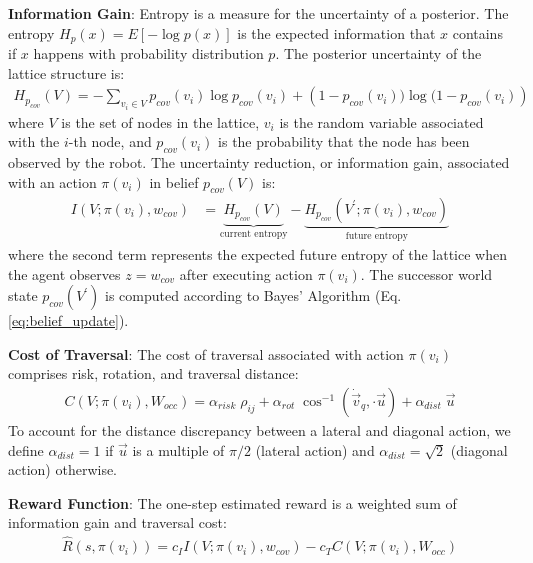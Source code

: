 \documentclass{article}
\newcommand{\ph}[1]{{\textbf{#1}:}} %
\begin{document}
\ph{Information Gain} Entropy is a measure for the uncertainty of a posterior. The entropy $H_p(x) = E[-\log p(x)]$ is the expected information that $x$ contains if $x$ happens with probability distribution $p$. The posterior uncertainty of the lattice structure is:
\begin{align}
    H_{p_{cov}}(V) = -\sum_{v_i \in V}p_{cov}(v_i) \log p_{cov}(v_i) + \left(1-p_{cov}(v_i)) \log (1-p_{cov}(v_i)\right)
\end{align}
where $V$ is the set of nodes in the lattice, $v_i$ is the random variable associated with the $i$-th node, and $p_{cov}(v_i)$ is the probability that the node has been observed by the robot. The uncertainty reduction, or information gain, associated with an action $\pi(v_i)$ in belief $p_{cov}(V)$ is:
\begin{align}
    I(V; \pi(v_i), w_{cov}) &= \underbrace{H_{p_{cov}}(V)}_\text{current entropy} - \underbrace{H_{p_{cov}}(V^\prime; \pi(v_i), w_{cov})}_\text{future entropy}
\end{align}
where the second term represents the expected future entropy of the lattice when the agent observes $z = w_{cov}$ after executing action $\pi(v_i)$. The successor world state $p_{cov}(V^\prime)$ is computed according to Bayes' Algorithm (Eq. \ref{eq:belief_update}). 

\ph{Cost of Traversal} The cost of traversal associated with action $\pi(v_i)$ comprises risk, rotation, and traversal distance:
\begin{align}
    C(V; \pi(v_i), W_{occ}) = \alpha_{risk} \; \rho_{ij} + \alpha_{rot} \;  \cos^{-1}(\dot{\vec{v}}_q, \cdot \vec{u}) + \alpha_{dist} \; \vec{u}
    \label{eq:traversal_cost}
\end{align}
To account for the distance discrepancy between a lateral and diagonal action, we define $\alpha_{dist}=1$ if $\vec{u}$ is a multiple of $\pi/2$ (lateral action) and $\alpha_{dist}=\sqrt{2}$ (diagonal action) otherwise.






\ph{Reward Function} The one-step estimated reward is a weighted sum of information gain and traversal cost:
\begin{align}
    \hat{R}(s, \pi(v_i)) = c_{I} I(V; \pi(v_i), w_{cov}) - c_{T}  C(V; \pi(v_i), W_{occ})
    \label{eq:lattice_reward}
\end{align}
\end{document}
